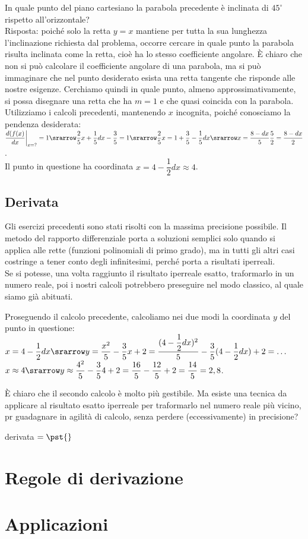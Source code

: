 \begin{esempio}
 In quale punto del piano cartesiano la parabola precedente è inclinata 
 di $45^\circ$ rispetto all'orizzontale?\\
 Risposta: poiché solo la retta $y=x$ mantiene per tutta la sua lunghezza
 l'inclinazione richiesta dal problema, occorre cercare in quale punto
 la parabola risulta inclinata come la retta, cioè ha lo stesso coefficiente 
 angolare. È chiaro che non si può calcolare il coefficiente angolare
 di una parabola, ma si può immaginare che nel punto desiderato esista una retta
 tangente che risponde alle nostre esigenze. Cerchiamo quindi in quale
 punto, almeno approssimativamente, si possa disegnare una retta che ha $m=1$ e
 che quasi coincida con la parabola.\\
 Utilizziamo i calcoli precedenti, mantenendo $x$ incognita, poiché conosciamo
 la pendenza desiderata:\\
 $\dfrac{d(f(x)}{dx}\bigg|_{x=?}=1 \srarrow 
 \dfrac{2}{5}x+\dfrac{1}{5}dx-\dfrac{3}{5}=1
 \srarrow \dfrac{2}{5}x=1+\dfrac{3}{5}-\dfrac{1}{5}dx
 \srarrow x=\dfrac{8-dx}{5}\dfrac{5}{2}=\dfrac{8-dx}{2}$.\\
 Il punto in questione ha coordinata $x= 4-\dfrac{1}{2}dx\approx 4$.  
\end{esempio}


\subsection{Derivata}
\label{subsec:diff01_deriv}
Gli esercizi precedenti sono stati risolti con la massima precisione possibile.
Il metodo del rapporto differenziale porta a soluzioni semplici solo quando 
si applica alle rette (funzioni polinomiali di primo grado), ma in tutti
gli altri casi costringe a tener conto degli infinitesimi, perché porta a 
risultati iperreali.\\
Se si potesse, una volta raggiunto il risultato iperreale esatto, traformarlo
in un numero reale, poi i nostri calcoli potrebbero preseguire nel modo classico,
al quale siamo già abituati.

\begin{esempio}
 Proseguendo il calcolo precedente, calcoliamo nei due modi la coordinata $y$ del 
 punto in questione:\\
 $x=4-\dfrac{1}{2}dx\srarrow y=\dfrac{x^2}{5}-\dfrac{3}{5}x+2=
 \dfrac{(4-\dfrac{1}{2}dx)^2}{5}-\dfrac{3}{5}(4-\dfrac{1}{2}dx)+2=\dots$\\
 $x\approx 4\srarrow y\approx\dfrac{4^2}{5}-\dfrac{3}{5}4+2=
 \dfrac{16}{5}-\dfrac{12}{5}+2=\dfrac{14}{5}=2,8$.\\
\end{esempio}
È chiaro che il secondo calcolo è molto più gestibile. Ma esiste una tecnica
da applicare al risultato esatto iperreale per traformarlo nel numero reale più
vicino, pr guadagnare in agilità di calcolo, senza perdere (eccessivamente) in 
precisione?
\begin{definizione}
derivata $=\pst{}$
\end{definizione}

\section{Regole di derivazione}
\label{sec:diff02_regolederivate}

\section{Applicazioni}
\label{sec:diff02_applicazioni}
